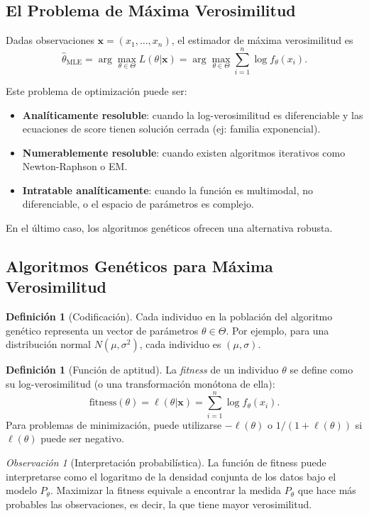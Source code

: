 \documentclass[11pt,a4paper]{article}
\theoremstyle{plain}
\theoremstyle{definition}
\newtheorem{definition}[theorem]{Definición}
\theoremstyle{remark}
\newtheorem{remark}[theorem]{Observación}
\newcommand{\1}{\mathbf{1}}
\begin{document}
\subsection{El Problema de Máxima Verosimilitud}

Dadas observaciones $\mathbf{x} = (x_1,\ldots,x_n)$, el estimador de máxima verosimilitud es
\[
\hat{\theta}_{\text{MLE}} = \arg\max_{\theta \in \Theta} L(\theta|\mathbf{x}) = \arg\max_{\theta \in \Theta} \sum_{i=1}^n \log f_\theta(x_i).
\]

Este problema de optimización puede ser:
\begin{itemize}
\item \textbf{Analíticamente resoluble}: cuando la log-verosimilitud es diferenciable y las ecuaciones de score tienen solución cerrada (ej: familia exponencial).
\item \textbf{Numerablemente resoluble}: cuando existen algoritmos iterativos como Newton-Raphson o EM.
\item \textbf{Intratable analíticamente}: cuando la función es multimodal, no diferenciable, o el espacio de parámetros es complejo.
\end{itemize}

En el último caso, los algoritmos genéticos ofrecen una alternativa robusta.

\subsection{Algoritmos Genéticos para Máxima Verosimilitud}

\begin{definition}[Codificación]
Cada individuo en la población del algoritmo genético representa un vector de parámetros $\theta \in \Theta$. Por ejemplo, para una distribución normal $N(\mu,\sigma^2)$, cada individuo es $(\mu,\sigma)$.
\end{definition}

\begin{definition}[Función de aptitud]
La \emph{fitness} de un individuo $\theta$ se define como su log-verosimilitud (o una transformación monótona de ella):
\[
\text{fitness}(\theta) = \ell(\theta|\mathbf{x}) = \sum_{i=1}^n \log f_\theta(x_i).
\]
Para problemas de minimización, puede utilizarse $-\ell(\theta)$ o $1/(1+\ell(\theta))$ si $\ell(\theta)$ puede ser negativo.
\end{definition}

\begin{remark}[Interpretación probabilística]
La función de fitness puede interpretarse como el logaritmo de la densidad conjunta de los datos bajo el modelo $P_\theta$. Maximizar la fitness equivale a encontrar la medida $P_\theta$ que hace más probables las observaciones, es decir, la que tiene mayor verosimilitud.
\end{remark}
\end{document}
